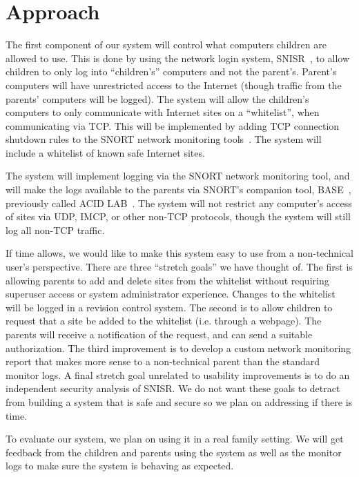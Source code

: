 \documentclass[12pt] {article}
\begin{document}
\section*{Approach}

The first component of our system will control what computers children are
allowed to use. This is done by using the network login system,
SNISR~\cite{snisr}, to allow children to only log into ``children's'' computers
and not the parent's.  Parent's computers will have unrestricted access to the
Internet (though traffic from the parents' computers will be logged). The
system will allow the children's computers to only communicate with Internet
sites on a ``whitelist'', when communicating via TCP.  This will be implemented
by adding TCP connection shutdown rules to the SNORT network monitoring
tools~\cite{snort}. The system will include a whitelist of known safe Internet
sites.

The system will implement logging via the SNORT network monitoring tool, and
will make the logs available to the parents via SNORT's companion tool,
BASE~\cite{base}, previously called ACID LAB~\cite{acidlab}. The system will
not restrict any computer's access of sites via UDP, IMCP, or other non-TCP
protocols, though the system will still log all non-TCP traffic.

If time allows, we would like to make this system easy to use from a
non-technical user's perspective. There are three ``stretch goals'' we have
thought of. The first is allowing parents to add and delete sites from the
whitelist without requiring superuser access or system administrator
experience. Changes to the whitelist will be logged in a revision control
system. The second is to allow children to request that a site be added to the
whitelist (i.e. through a webpage). The parents will receive a notification of
the request, and can send a suitable authorization. The third improvement is to
develop a custom network monitoring report that makes more sense to a
non-technical parent than the standard monitor logs. A final stretch goal
unrelated to usability improvements is to do an independent security analysis
of SNISR. We do not want these goals to detract from building a system that is
safe and secure so we plan on addressing if there is time.

To evaluate our system, we plan on using it in a real family setting. We will
get feedback from the children and parents using the system as well as the
monitor logs to make sure the system is behaving as expected.
\end{document}

